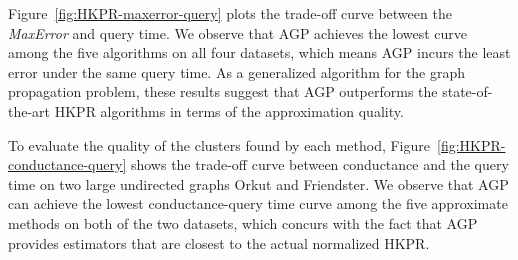  

Figure~\ref{fig:HKPR-maxerror-query} plots the trade-off curve between the {\em MaxError} and query time. We observe that AGP  achieves the lowest curve among the five algorithms on all four datasets, which means AGP incurs the least error under the same query time. As a generalized algorithm for the graph propagation problem, these results suggest that AGP outperforms the state-of-the-art HKPR algorithms in terms of the approximation quality. 


To evaluate the quality of the clusters found by each method, Figure~\ref{fig:HKPR-conductance-query} shows the trade-off curve between conductance and the query time on two large undirected graphs Orkut and Friendster. 
We observe that AGP can achieve the lowest conductance-query time curve among the five approximate methods on both of the two datasets, which concurs with the fact that AGP provides estimators that are closest to the actual normalized HKPR. 


